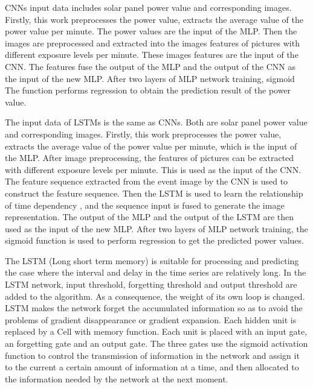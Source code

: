 CNNs input data includes solar panel power value and corresponding images. Firstly, this work preprocesses the power value, extracts the average value of the power value per minute. The power values are the input of the MLP. Then  the images are preprocessed and extracted into the images features of pictures with different exposure levels per minute. 
These images features are the input of the CNN. The features fuse the output of the MLP and the output of the CNN as the input of the new MLP. After two layers of MLP network training, sigmoid The function performs regression to obtain the prediction result of the power value.

The input data of LSTMs is the same as CNNs. Both are solar panel power value and corresponding images. Firstly, this work preprocesses the power value, extracts the average value of the power value per minute, which is the input of the MLP. 
After image preprocessing,  the features of pictures can be extracted with different exposure levels per minute. This is used as the input of the CNN. 
The feature sequence extracted from the event image by the CNN is used to construct the feature sequence. 
Then the LSTM is used to learn the relationship of time dependency , and the sequence input is fused to generate the image representation.\cite{liu2018wind} The output of the MLP and the output of the LSTM are then used as the input of the new MLP. After two layers of MLP network training, the sigmoid function is used to perform regression to get the predicted power values.

The LSTM (Long short term memory) is suitable for processing and predicting the case where the interval and delay in the time series are relatively long.\cite{li2018prediction} 
In the LSTM network, input threshold, forgetting threshold and output  threshold  are added to the algorithm. As a consequence, the weight of its own loop is changed.\cite{gers1999learning} 
LSTM makes the network  forget the accumulated information  so as to avoid the problems  of gradient disappearance or gradient expansion. Each hidden unit is replaced by a Cell with memory function. Each unit is placed with an input gate, an forgetting gate and an output gate.\cite{wang2018research} The three gates use the sigmoid activation function to control the transmission of information in the network and assign it to the current a certain amount of information at a time, and then allocated to the information needed by the network at the next moment.\cite{zhang2018use} \\[2ex]




